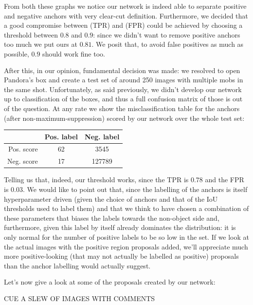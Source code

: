 \documentclass[10pt,journal,cspaper,compsoc]{IEEEtran}
\begin{document}
    From both these graphs we notice our network is indeed able to separate positive and negative anchors with very clear-cut definition. Furthermore, we decided that a good compromise between (TPR) and (FPR) could be achieved by choosing a threshold between $0.8$ and $0.9$: since we didn't want to remove positive anchors too much we put ours at $0.81$. We posit that, to avoid false positives as much as possible, $0.9$ should work fine too.

    After this, in our opinion, fundamental decision was made: we resolved to open Pandora's box and create a test set of around 250 images with multiple mobs in the same shot. Unfortunately, as said previously, we didn't develop our network up to classification of the boxes, and thus a full confusion matrix of those is out of the question. At any rate we show the misclassification table for the anchors (after non-maximum-suppression) scored by our network over the whole test set:

    \begin{center}
        \begin{tabular}{r|c c}
            & Pos. label & Neg. label \\
            \hline
            Pos. score & 62 & 3545 \\
            Neg. score & 17 & 127789
        \end{tabular}
    \end{center}

    Telling us that, indeed, our threshold works, since the TPR is $0.78$ and the FPR is $0.03$. We would like to point out that, since the labelling of the anchors is itself hyperparameter driven (given the choice of anchors and that of the IoU thresholds used to label them) and that we think to have chosen a combination of these parameters that biases the labels towards the non-object side and, furthermore, given this label by itself already dominates the distribution: it is only normal for the number of positive labels to be so low in the set. If we look at the actual images with the positive region proposals added, we'll appreciate much more positive-looking (that may not actually be labelled as positive) proposals than the anchor labelling would actually suggest.

    Let's now give a look at some of the proposals created by our network:

    CUE A SLEW OF IMAGES WITH COMMENTS

    
    
\end{document}
